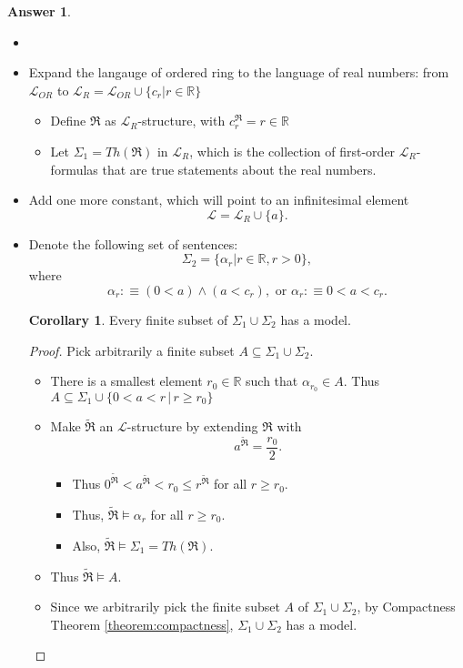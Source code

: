 \documentclass[11pt,letterpaper]{book}
\theoremstyle{definition}
\newtheorem{corollary}{Corollary}[section]
\newtheorem{answer}{Answer}[section]
\begin{document}
\begin{answer}
\begin{itemize}
\item[]
\item{Expand the langauge of ordered ring to the language of real
numbers: from $\mathcal{L}_{OR}$ to $\mathcal{L}_{R} = \mathcal{L}_{OR}
\cup \{ c_r | r \in \mathbb{R} \} $}

     \begin{itemize}
     \item{Define $\mathfrak{R}$ as $\mathcal{L}_{R}$-structure, with $c_r
^{\mathfrak{R}} = r \in \mathbb{R} $}
     \item{Let $\Sigma_1 = Th(\mathfrak{R})$ in $\mathcal{L}_R$, which is
the collection of first-order $\mathcal{L}_R$-formulas that are true
statements about the real numbers.}
     \end{itemize}
\item{Add one more constant, which will point to an infinitesimal element
$$ \mathcal{L} = \mathcal{L}_R \cup \{ a \}. $$
}
\item{Denote the following set of sentences:
$$\Sigma_2 = \{ \alpha_r | r \in \mathbb{R}, r>0  \},  $$
where
$$ \alpha_r :\equiv (0<a ) \land (a < c_r), \text{ or } \alpha_r :\equiv
0 < a < c_r .$$
}
\begin{corollary}
Every finite subset of $\Sigma_1 \cup \Sigma_2$ has a model.
\end{corollary}

\begin{proof}
Pick arbitrarily a finite subset $A \subseteq \Sigma_1 \cup \Sigma_2$.

\begin{itemize}
\item{There is a smallest element $r_0 \in \mathbb{R}$ such that
$\alpha_{r_0} \in A $. Thus $A \subseteq \Sigma_1 \cup \{  0 < a < r \,
| \, r  \geq r_0 \}$}
\item{Make $\tilde{ \mathfrak{R} }$ an $\mathcal{L}$-structure by
extending $\mathfrak{R}$ with
$$ a^{\tilde{\mathfrak{R}}} = \frac{r_0}{2} . $$
}
\begin{itemize}
\item{Thus $ 0^{\tilde{\mathfrak{R}}} < a^{\tilde{\mathfrak{R}}} < r_0
\leq r^{\tilde{\mathfrak{R}}} $ for all $r \geq r_0$.}
\item{Thus, $\tilde{\mathfrak{R}} \models \alpha_r$ for all $r \geq r_0 $.}
\item{Also, $\tilde{\mathfrak{R}} \models \Sigma_1 = Th(\mathfrak{R})$.}
\end{itemize}
\item{Thus $\tilde{\mathfrak{R}} \models A $.}
\item{Since we arbitrarily pick the finite subset $A$ of $\Sigma_1 \cup
\Sigma_2$, by Compactness Theorem \ref{theorem:compactness}, $\Sigma_1
\cup \Sigma_2$ has a model.}
\end{itemize}



\end{proof}
\end{itemize}
\end{answer}
\end{document}
